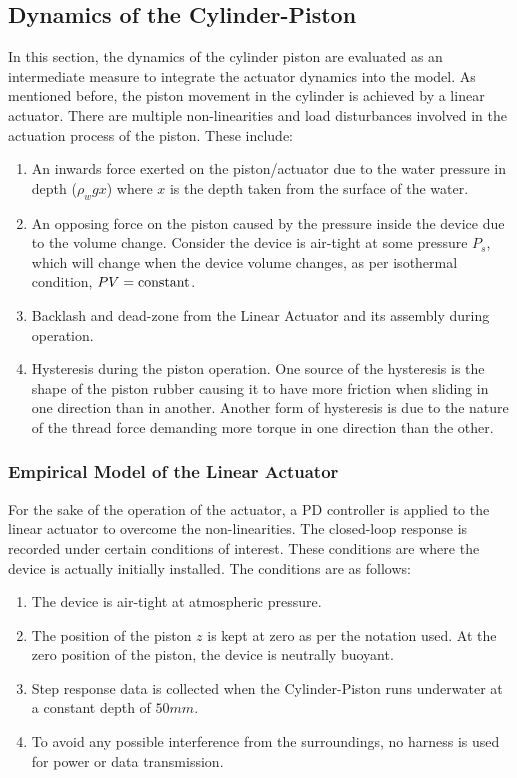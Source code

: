 \documentclass[conference, letterpaper]{IEEEtran}
\begin{document}
\subsection{Dynamics of the Cylinder-Piston}
In this section, the dynamics of the cylinder piston are evaluated as an intermediate measure to integrate the actuator dynamics into the model. As mentioned before, the piston movement in the cylinder is achieved by a linear actuator. There are multiple non-linearities and load disturbances involved in the actuation process of the piston. These include:

\begin{enumerate}
    \item An inwards force exerted on the piston/actuator due to the water pressure in depth ($\rho_w g x$) where $x$ is the depth taken from the surface of the water.
    \item An opposing force on the piston caused by the pressure inside the device due to the volume change. Consider the device is air-tight at some pressure $P_s$, which will change when the device volume changes, as per isothermal condition, $PV ={\rm constant}$.
    \item Backlash and dead-zone from the Linear Actuator and its assembly during operation.
    \item Hysteresis during the piston operation. One source of the hysteresis is the shape of the piston rubber causing it to have more friction when sliding in one direction than in another. Another form of hysteresis is due to the nature of the thread force demanding more torque in one direction than the other.
\end{enumerate}

\vspace{10pt}


\subsubsection{Empirical Model of the Linear Actuator}
For the sake of the operation of the actuator, a PD controller is applied to the linear actuator to overcome the non-linearities. The closed-loop response is recorded under certain conditions of interest. These conditions are where the device is actually initially installed. The conditions are as follows:

\begin{enumerate}
    \item The device is air-tight at atmospheric pressure.
    \item The position of the piston $z$ is kept at zero as per the notation used. At the zero position of the piston, the device is neutrally buoyant.
    \item Step response data is collected when the Cylinder-Piston runs underwater at a constant depth of $50 mm$.
    \item To avoid any possible interference from the surroundings, no harness is used for power or data transmission.
\end{enumerate}
\end{document}
